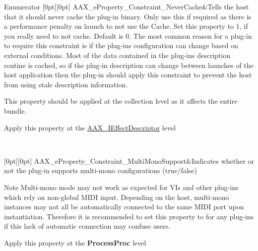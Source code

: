 \begin{DoxyEnumFields}{Enumerator}
[0pt][0pt]{}\mbox{\label{a00662_a13e384f22825afd3db6d68395b79ce0da77be51d1855af1b15fbc233097844cdf}} 
A\+A\+X\+\_\+e\+Property\+\_\+\+Constraint\+\_\+\+Never\+Cache&Tells the host that it should never cache the plug-\/in binary. Only use this if required as there is a performance penalty on launch to not use the Cache. Set this property to 1, if you really need to not cache. Default is 0. The most common reason for a plug-\/in to require this constraint is if the plug-\/in\textquotesingle{}s configuration can change based on external conditions. Most of the data contained in the plug-\/in\textquotesingle{}s description routine is cached, so if the plug-\/in description can change between launches of the host application then the plug-\/in should apply this constraint to prevent the host from using stale description information.

This property should be applied at the collection level as it affects the entire bundle.

\begin{DoxyItemize}
\item Apply this property at the \mbox{\hyperlink{a01813}{A\+A\+X\+\_\+\+I\+Effect\+Descriptor}} level \end{DoxyItemize}
\\
\hline

[0pt][0pt]{}\mbox{\label{a00662_a13e384f22825afd3db6d68395b79ce0da83f671685958bdc668ef574d5a2d92b0}} 
A\+A\+X\+\_\+e\+Property\+\_\+\+Constraint\+\_\+\+Multi\+Mono\+Support&Indicates whether or not the plug-\/in supports multi-\/mono configurations ({\ttfamily true/{\ttfamily false})} \begin{DoxyNote}{Note}
Multi-\/mono mode may not work as expected for V\+Is and other plug-\/ins which rely on non-\/global M\+I\+DI input. Depending on the host, multi-\/mono instances may not all be automatically connected to the same M\+I\+DI port upon instantiation. Therefore it is recommended to set this property to {} for any plug-\/ins if this lack of automatic connection may confuse users.
\end{DoxyNote}
\begin{DoxyItemize}
\item Apply this property at the {\bfseries{Process\+Proc}} level \end{DoxyItemize}
\\
\hline


\end{DoxyEnumFields}
